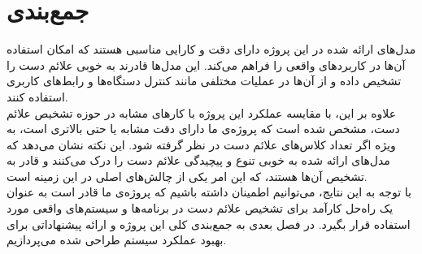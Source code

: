 \pagebreak


\section{جمع‌بندی}
مدل‌های ارائه شده در این پروژه دارای دقت و کارایی مناسبی هستند که امکان استفاده آن‌ها در کاربردهای واقعی را فراهم می‌کند. این مدل‌ها قادرند به خوبی علائم‌ دست را تشخیص داده و از آن‌ها در عملیات مختلفی مانند کنترل دستگاه‌ها و رابط‌های کاربری استفاده کنند.
\\
علاوه بر این، با مقایسه عملکرد  این پروژه با کارهای مشابه در حوزه تشخیص علائم‌ دست، مشخص شده است که پروژه‌ی ما دارای دقت مشابه یا حتی بالاتری است، به ویژه اگر تعداد کلاس‌های علائم دست در نظر گرفته شود. این نکته نشان می‌دهد که مدل‌های ارائه شده به خوبی تنوع و پیچیدگی علائم‌ دست را درک می‌کنند و قادر به تشخیص آن‌ها هستند، که این امر یکی از چالش‌های اصلی در این زمینه است.
\\
با توجه به این نتایج، می‌توانیم اطمینان داشته باشیم که پروژه‌ی ما قادر است به عنوان یک راه‌حل کارآمد برای تشخیص علائم‌ دست در برنامه‌ها و سیستم‌های واقعی مورد استفاده قرار بگیرد.
در فصل بعدی به جمع‌بندی کلی این پروژه و ارائه پیشنهاداتی برای بهبود عملکرد سیستم طراحی شده می‌پردازیم.

